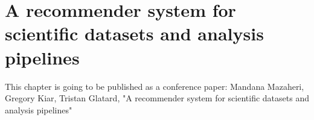 \chapter{A recommender system for scientific datasets and analysis pipelines}
\label{pipeline-dataset-recommender}

This chapter is going to be published as a conference paper: Mandana Mazaheri, Gregory Kiar, Tristan Glatard, "A recommender system for scientific datasets and analysis pipelines" \